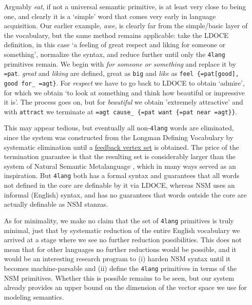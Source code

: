 \documentclass[output=paper,colorlinks=true,citecolor=brown]{langscibook}
\begin{document}
Arguably \emph{eat}, if not a universal semantic primitive, is at least very
close to being one, and clearly it is a `simple' word \citet{Kornai:2021} that
comes very early in language acquisition. Our earlier example, \emph{awe}, is
clearly far from the simple/basic layer of the vocabulary, but the same method
remains applicable: take the LDOCE definition, in this case `a feeling of
great respect and liking for someone or something', normalize the syntax, and
reduce further until only the \texttt{4lang} primitives remain. We begin with
\emph{for someone or something} and replace it by \texttt{=pat}. \emph{great}
and \emph{liking} are defined, great as \texttt{big} and \emph{like} as
\texttt{feel \{=pat[good], good for\_ =agt\}}. For \emph{respect} we have to
go back to LDOCE to obtain `admire', for which we obtain `to look at something
and think how beautiful or impressive it is'. The process goes on, but for
\emph{beautiful} we obtain 'extremely attractive' and with \texttt{attract} we
terminate at \texttt{=agt cause\_ \{=pat want \{=pat near =agt\}\}}.

This may appear tedious, but eventually all non-\texttt{4lang} words are
eliminated, since the system was constructed from the Longman Defining
Vocabulary by systematic elimination \citep{Acs:2019b} until a
\href{https://en.wikipedia.org/wiki/Feedback_vertex_set}{feedback vertex set}
is obtained. The price of the termination guarantee is that the resulting set
is considerably larger than the system of Natural Semantic Metalanguage
\citep{Wierzbicka:1992,Wierzbicka:1996,Goddard:2002}, which in many ways
served as an inspiration. But \texttt{4lang} both has a formal syntax and
guarantees that all words not defined in the core are definable by it via
LDOCE, whereas NSM uses an informal (English) syntax, and has no guarantees
that words outside the core are actually definable as NSM stanzas.

As for minimality, we make no claim that the set of \texttt{4lang} primitives
is truly minimal, just that by systematic reduction of the entire English
vocabulary we arrived at a stage where we see no further reduction
possibilities.  This does not mean that for other languages no further
reductions would be possible, and it would be an interesting research program
to (i) harden NSM syntax until it becomes machine-parsable and (ii) define the
\texttt{4lang} primitives in terms of the NSM primitives. Whether this is
possible remains to be seen, but our system already provides an upper bound on
the dimension of the vector space we use for modeling semantics.
\end{document}
